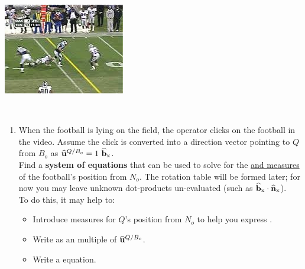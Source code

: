 \documentclass[11pt,letterpaper]{book}
\begin{document}
\begin{enumerate}
\begin{minipage}[t]{0.7\linewidth}
\end{minipage}
\hfill
\begin{minipage}[t]{0.27\linewidth}
\vspace{-0.5pc}
\includegraphics[width=\linewidth]{firstAndTen.jpg}
\end{minipage}
\\[0.2pc]
%
\begin{enumerate}
\item
\begin{minipage}[t]{0.6\linewidth}
When the football is lying on the field, the operator clicks on the football in the video.
Assume the click is converted into a direction vector pointing to $Q$ from $B_o$ as $\mathbf{\widehat{u}}^{Q/B_o} = 1~\mathbf{\widehat{b}}_{\mathrm{x}}{}$.
\\[0.5pc]
Find a \textbf{system of  equations} that can be used to solve for the \underline{ and  measures} of the football's position from $N_o$. The rotation table will be formed later; for now you may leave unknown dot-products un-evaluated (such as $\mathbf{\widehat{b}}_{\mathrm{x}}{} \cdot \mathbf{\widehat{n}}_{\mathrm{x}}{}$).
\\[0.5pc]
To do this, it may help to:
\begin{itemize}
\item Introduce  measures for $Q$'s position from $N_o$ to help you express .
\item Write  as an  multiple of $\mathbf{\widehat{u}}^{Q/B_o}$.
\item Write a  equation.

\end{itemize}
\end{minipage}
\end{enumerate}
\end{enumerate}
\end{document}

